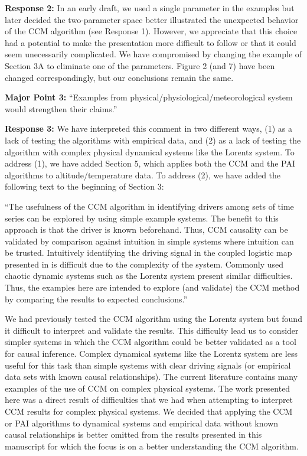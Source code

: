 \documentclass[twocolumn,aps,pre,groupedaddress]{revtex4-1}
\begin{document}
\textbf{Response 2:} In an early draft, we used a single parameter in the examples but later decided the two-parameter space better illustrated the unexpected behavior of the CCM algorithm (see Response 1).  However, we appreciate that this choice had a potential to make the presentation more difficult to follow or that it could seem unecessarily complicated.  We have compromised by changing the example of Section 3A to eliminate one of the parameters.  Figure 2 (and 7) have been changed correspondingly, but our conclusions remain the same.\newline

\textbf{Major Point 3:} ``Examples from physical/physiological/meteorological system would strengthen their claims.''

\textbf{Response 3:}  We have interpreted this comment in two different ways, (1) as a lack of testing the algorithms with empirical data, and (2) as a lack of testing the algorithm with complex physical dynamical systems like the Lorentz system.  To address (1), we have added Section 5, which applies both the CCM and the PAI algorithms to altitude/temperature data.  To address (2), we have added the following text to the beginning of Section 3:\newline

``The usefulness of the CCM algorithm in identifying drivers among sets of time series can be explored by using simple example systems.  The benefit to this approach is that the driver is known beforehand.  Thus, CCM causality can be validated by comparison against intuition in simple systems where intuition can be trusted.  Intuitively identifying the driving signal in the coupled logistic map presented in \cite{Sugihara2012} is difficult due to the complexity of the system.  Commonly used chaotic dynamic systems such as the Lorentz system present similar difficulties.  Thus, the examples here are intended to explore (and validate) the CCM method by comparing the results to expected conclusions.''\newline

We had previously tested the CCM algorithm using the Lorentz system but found it difficult to interpret and validate the results.  This difficulty lead us to consider simpler systems in which the CCM algorithm could be better validated as a tool for causal inference.  Complex dynamical systems like the Lorentz system are less useful for this task than simple  systems with clear driving signals (or empirical data sets with known causal relationships).   The current literature contains many examples of the use of CCM on complex physical systems.  The work presented here was a direct result of difficulties that we had when attempting to interpret CCM results for complex physical systems.  We decided that applying the CCM or PAI algorithms to dynamical systems and empirical data without known causal relationships is better omitted from the results presented in this manuscript for which the focus is on a better understanding the CCM algorithm.\newline
\end{document}
